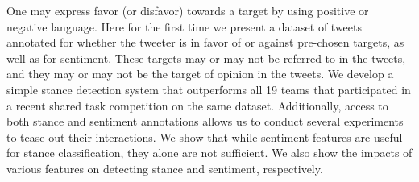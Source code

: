 One may express favor (or disfavor) towards a target by using  positive or negative language. Here for the first time we present a dataset of tweets annotated for whether the tweeter is in favor of or against pre-chosen targets, as well as for sentiment. These targets may or may not be referred to in the tweets, and they may or may not be the target of opinion in the tweets. We develop a simple stance detection system that outperforms all 19 teams that participated in a recent shared task competition on the same dataset. Additionally, access to both stance and sentiment annotations allows us to conduct several experiments to tease out their interactions. We show that while sentiment features  are useful for stance classification, they alone are not sufficient. We also show the impacts of various features on detecting stance and sentiment, respectively.
